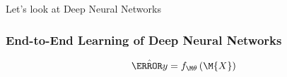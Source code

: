 
{
	\begin{frame}[plain]
	
	\vspace{8em}
	\begin{center}
		\Huge\color{tumbluedark}
		Let's look at Deep Neural Networks
	\end{center}\color{white}
	
\end{frame}
}


\begin{frame}

\frametitle{End-to-End Learning of Deep Neural Networks}
\centering

\Huge
\begin{equation*}
\yhat = f_\Mweight \left(\M{X}\right)
\end{equation*}

\end{frame}



%

%		


%


%
%

%
%
%
%
%


